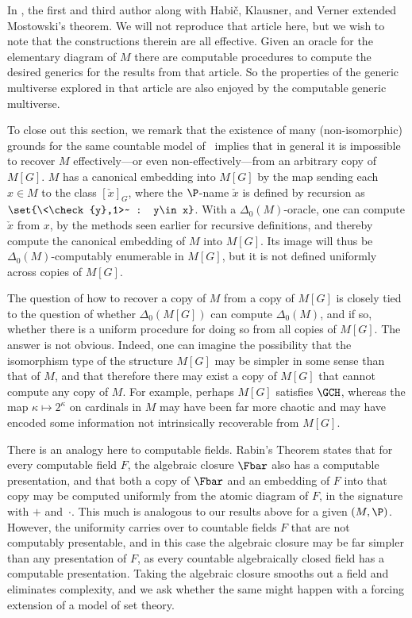 \documentclass{amsart}
\newcommand{\xcheck}{\check{x}}
\newcommand{\ycheck}{\check{y}}
\begin{document}
In \cite{HHKVW2019}, the first and third author along with Habi\v{c}, Klausner, and Verner extended Mostowski's theorem. We will not reproduce that article here, but we wish to note that the constructions therein are all effective. Given an oracle for the elementary diagram of $M$ there are computable procedures to compute the desired generics for the results from that article. So the properties of the generic multiverse explored in that article are also enjoyed by the computable generic multiverse.
\smallskip

To close out this section, we remark that the existence of many (non-isomorphic) grounds for the same countable
model of \ZFC\ implies that in general it is impossible to recover $M$ effectively---or even non-effectively---from an arbitrary copy of $M[G]$.  $M$ has a canonical embedding into $M[G]$
by the map sending each $x\in M$ to the class $[\xcheck]_G$, where the $\P$-name
$\xcheck$ is defined by recursion as $\set{\<\ycheck,1>~ : y\in x}$.  With a
$\Delta_0(M)$-oracle, one can compute $\xcheck$ from $x$, by the methods
seen earlier for recursive definitions,
and thereby compute the canonical embedding of $M$ into $M[G]$.
Its image will thus be $\Delta_0(M)$-computably enumerable in $M[G]$,
but it is not defined uniformly across copies of $M[G]$.

The question of how to recover a copy of $M$
from a copy of $M[G]$ is closely tied to the question of whether
$\Delta_0(M[G])$ can compute $\Delta_0(M)$, and if so, whether there
is a uniform procedure for doing so from all copies of $M[G]$.  The answer is not obvious.
Indeed, one can imagine the possibility that the isomorphism type of the structure
$M[G]$ may be simpler in some sense than that of $M$, and that therefore
there may exist a copy of $M[G]$ that cannot compute any copy of $M$.
For example, perhaps $M[G]$ satisfies $\GCH$, whereas the map
$\kappa\mapsto 2^{\kappa}$ on cardinals in $M$ may have been far more
chaotic and may have encoded some information not intrinsically recoverable
from $M[G]$.

There is an analogy here to computable fields.  Rabin's Theorem states that for
every computable field $F$, the algebraic closure $\Fbar$ also has a computable
presentation, and that both a copy of $\Fbar$ and an embedding of $F$ into that copy
may be computed uniformly from the atomic diagram of $F$, in the signature
with $+$ and~$\cdot$.  This much is analogous to our results above for a given
$(M,\P)$.  However, the uniformity carries over to countable fields $F$ that
are not computably presentable, and in this case the algebraic closure may be
far simpler than any presentation of $F$, as every countable algebraically closed field
has a computable presentation.  Taking the algebraic closure smooths out a field
and eliminates complexity, and we ask whether the same might happen with a forcing extension of a model of set theory.
\end{document}
